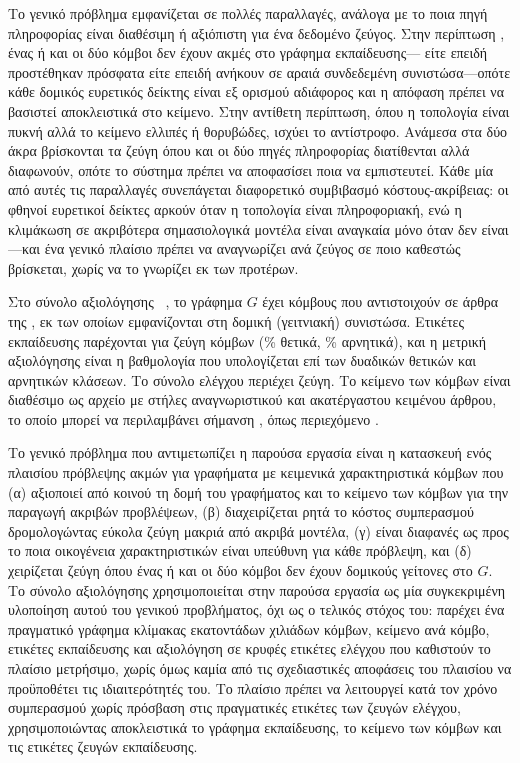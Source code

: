 Το γενικό πρόβλημα εμφανίζεται σε πολλές παραλλαγές, ανάλογα με το ποια πηγή
πληροφορίας είναι διαθέσιμη ή αξιόπιστη για ένα δεδομένο ζεύγος.
Στην περίπτωση
, ένας ή και οι δύο κόμβοι δεν έχουν ακμές στο γράφημα εκπαίδευσης---
είτε επειδή προστέθηκαν πρόσφατα είτε επειδή ανήκουν σε αραιά συνδεδεμένη
συνιστώσα---οπότε κάθε δομικός ευρετικός δείκτης είναι εξ ορισμού αδιάφορος και η
απόφαση πρέπει να βασιστεί αποκλειστικά στο κείμενο.
Στην αντίθετη περίπτωση, όπου
η τοπολογία είναι πυκνή αλλά το κείμενο ελλιπές ή θορυβώδες, ισχύει το αντίστροφο.
Ανάμεσα στα δύο άκρα βρίσκονται τα ζεύγη όπου και οι δύο πηγές πληροφορίας
διατίθενται αλλά διαφωνούν, οπότε το σύστημα πρέπει να αποφασίσει ποια να
εμπιστευτεί.
Κάθε μία από αυτές τις παραλλαγές συνεπάγεται διαφορετικό
συμβιβασμό κόστους-ακρίβειας: οι φθηνοί ευρετικοί δείκτες αρκούν όταν η
τοπολογία είναι πληροφοριακή, ενώ η κλιμάκωση σε ακριβότερα σημασιολογικά
μοντέλα είναι αναγκαία μόνο όταν δεν είναι---και ένα γενικό πλαίσιο πρέπει να
αναγνωρίζει ανά ζεύγος σε ποιο καθεστώς βρίσκεται, χωρίς να το γνωρίζει εκ των
προτέρων.

Στο σύνολο αξιολόγησης ~\cite{phan2023link}, το γράφημα $G$
έχει \GraphNodesTotal{} κόμβους που αντιστοιχούν σε άρθρα της , εκ των οποίων
\GraphNodes{} εμφανίζονται στη δομική (γειτνιακή) συνιστώσα.
Ετικέτες εκπαίδευσης
παρέχονται για \TrainPairs{} ζεύγη κόμβων (\TrainPosPct\% θετικά, \TrainNegPct\% αρνητικά), και η μετρική
αξιολόγησης είναι η βαθμολογία  που υπολογίζεται επί των δυαδικών
θετικών και αρνητικών κλάσεων.
Το σύνολο ελέγχου περιέχει \TestPairs{} ζεύγη.
Το κείμενο
των κόμβων είναι διαθέσιμο ως αρχείο \texttt{} με στήλες
αναγνωριστικού και ακατέργαστου κειμένου άρθρου, το οποίο μπορεί να περιλαμβάνει
σήμανση , όπως περιεχόμενο .

Το γενικό πρόβλημα που αντιμετωπίζει η παρούσα εργασία είναι η κατασκευή ενός
πλαισίου πρόβλεψης ακμών για γραφήματα με κειμενικά χαρακτηριστικά κόμβων που (α)
αξιοποιεί από κοινού τη δομή του γραφήματος και το κείμενο των κόμβων για την
παραγωγή ακριβών προβλέψεων, (β) διαχειρίζεται ρητά το κόστος συμπερασμού
δρομολογώντας εύκολα ζεύγη μακριά από ακριβά μοντέλα, (γ) είναι διαφανές ως προς
το ποια οικογένεια χαρακτηριστικών είναι υπεύθυνη για κάθε πρόβλεψη, και (δ)
χειρίζεται ζεύγη  όπου ένας ή και οι δύο κόμβοι δεν έχουν
δομικούς γείτονες στο $G$.
Το σύνολο αξιολόγησης  χρησιμοποιείται στην παρούσα
εργασία ως μία συγκεκριμένη υλοποίηση αυτού του γενικού προβλήματος, όχι ως ο
τελικός στόχος του: παρέχει ένα πραγματικό γράφημα κλίμακας εκατοντάδων χιλιάδων
κόμβων, κείμενο ανά κόμβο, ετικέτες εκπαίδευσης και αξιολόγηση σε κρυφές
ετικέτες ελέγχου που καθιστούν το
πλαίσιο μετρήσιμο, χωρίς όμως καμία από τις σχεδιαστικές αποφάσεις του πλαισίου
να προϋποθέτει τις ιδιαιτερότητές του.
Το πλαίσιο πρέπει να λειτουργεί κατά τον χρόνο
συμπερασμού χωρίς πρόσβαση στις πραγματικές ετικέτες των ζευγών ελέγχου,
χρησιμοποιώντας αποκλειστικά το γράφημα εκπαίδευσης, το κείμενο των κόμβων και τις
ετικέτες ζευγών εκπαίδευσης.

